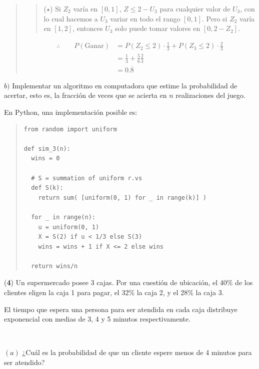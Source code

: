 \documentclass[a4paper, 12pt]{article}
\begin{document}
\begin{quote}
\begin{quote}
  ($\star$) Si $Z_2$ varía en $[0, 1]$, $Z \leq 2 - U_3$ para cualquier valor de
  $U_3$, con lo cual hacemos a $U_3$ variar en todo el rango $[0, 1]$.  Pero si
  $Z_2$ varía en $[1, 2]$, entonces $U_3$ solo puede tomar valores en $[0, 2 -
  Z_2]$.
\end{quote}

\begin{align*}
  \therefore \qquad P(\text{Ganar}) 
  &= P(Z_2 \leq 2) \cdot \frac{1}{3} + P(Z_3 \leq 2) \cdot
  \frac{2}{3} \\ 
  &= \frac{1}{3} + \frac{5}{6}\frac{2}{3} \\ 
  &= 0.\overline{8}
\end{align*}

\end{quote}
\normalsize



$b)$ Implementar un algoritmo en computadora que estime la probabilidad de acertar, esto es, la fracción
de veces que se acierta en $n$ realizaciones del juego. 

En Python, una implementación posible es:

\small
\begin{quote}

\begin{verbatim}
from random import uniform

def sim_3(n):
  wins = 0 

  # S = summation of uniform r.vs
  def S(k): 
    return sum( [uniform(0, 1) for _ in range(k)] )

  for _ in range(n):
    u = uniform(0, 1)
    X = S(2) if u < 1/3 else S(3)
    wins = wins + 1 if X <= 2 else wins

  return wins/n
\end{verbatim}

\end{quote}
\normalsize

\pagebreak 

(\textbf{4}) Un supermercado posee 3 cajas. Por una cuestión de ubicación, el
40\% de los clientes eligen la caja 1 para pagar, el 32\% la caja 2, y el 28\%
la caja 3. 

El tiempo que espera una persona para ser atendida en cada caja
distribuye exponencial con medias de 3, 4 y 5 minutos respectivamente. 

~

$(a)$ ¿Cuál es la probabilidad de que un cliente espere menos de 4 minutos para ser
atendido? 
\end{document}
